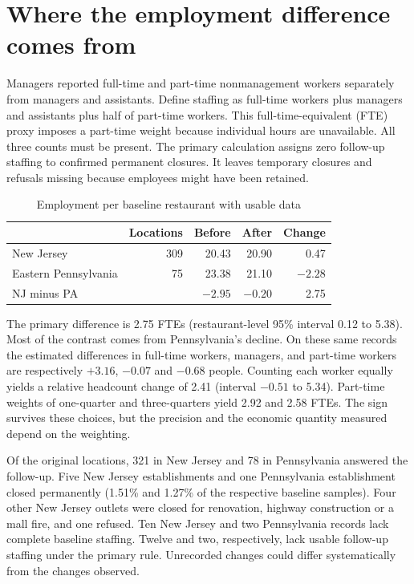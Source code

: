 \documentclass[11pt]{article}
\begin{document}
\newpage
\section{Where the employment difference comes from}
Managers reported full-time and part-time nonmanagement workers separately from managers and assistants. Define staffing as full-time workers plus managers and assistants plus half of part-time workers. This full-time-equivalent (FTE) proxy imposes a part-time weight because individual hours are unavailable. All three counts must be present. The primary calculation assigns zero follow-up staffing to confirmed permanent closures. It leaves temporary closures and refusals missing because employees might have been retained.

\begin{table}[h!]
\centering
\caption{Employment per baseline restaurant with usable data}
\begin{tabular}{lrrrr}
\toprule
 & Locations & Before & After & Change\\
\midrule
New Jersey &309&20.43&20.90&0.47\\
Eastern Pennsylvania &75&23.38&21.10&$-2.28$\\
\midrule
NJ minus PA &&$-2.95$&$-0.20$&2.75\\
\bottomrule
\end{tabular}
\end{table}

The primary difference is 2.75 FTEs (restaurant-level 95\% interval 0.12 to 5.38). Most of the contrast comes from Pennsylvania's decline. On these same records the estimated differences in full-time workers, managers, and part-time workers are respectively $+3.16$, $-0.07$ and $-0.68$ people. Counting each worker equally yields a relative headcount change of 2.41 (interval $-0.51$ to 5.34). Part-time weights of one-quarter and three-quarters yield 2.92 and 2.58 FTEs. The sign survives these choices, but the precision and the economic quantity measured depend on the weighting.

Of the original locations, 321 in New Jersey and 78 in Pennsylvania answered the follow-up. Five New Jersey establishments and one Pennsylvania establishment closed permanently (1.51\% and 1.27\% of the respective baseline samples). Four other New Jersey outlets were closed for renovation, highway construction or a mall fire, and one refused. Ten New Jersey and two Pennsylvania records lack complete baseline staffing. Twelve and two, respectively, lack usable follow-up staffing under the primary rule. Unrecorded changes could differ systematically from the changes observed.
\end{document}
